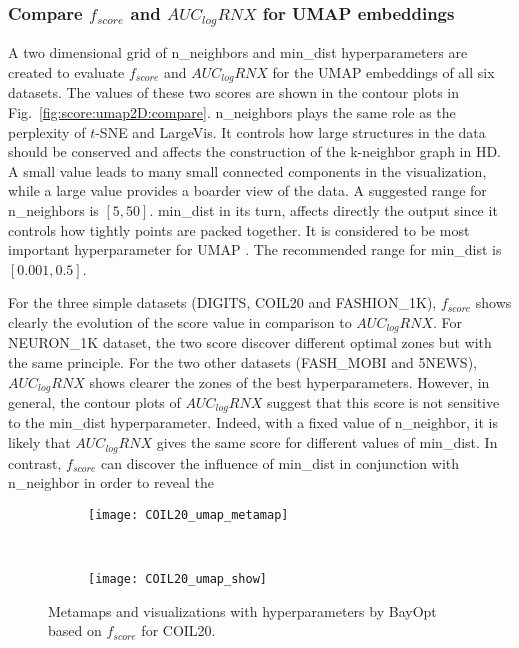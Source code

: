 \subsubsection{Compare $f_{score}$ and $AUC_{log}RNX$ for UMAP embeddings}\label{sec:compare:umap}

A two dimensional grid of {n\_neighbors} and {min\_dist} hyperparameters are created to evaluate $f_{score}$ and $AUC_{log}RNX$ for the UMAP embeddings of all six datasets.
The values of these two scores are shown in the contour plots in Fig.~\ref{fig:score:umap2D:compare}.
{n\_neighbors} plays the same role as the perplexity of $t$-SNE and LargeVis.
It controls how large structures in the data should be conserved and affects the construction of the k-neighbor graph in HD.
A small value leads to many small connected components in the visualization, while a large value provides a boarder view of the data.
A suggested range for {n\_neighbors} is $[5, 50]$.
{min\_dist} in its turn, affects directly the output since it controls how tightly points are packed together. It is considered to be most important hyperparameter for UMAP \cite{mcinnes2018umap}.
The recommended range for {min\_dist} is $[0.001, 0.5]$.

For the three simple datasets (DIGITS, COIL20 and {FASHION\_1K}), $f_{score}$ shows clearly the evolution of the score value in comparison to $AUC_{log}RNX$.
For {NEURON\_1K} dataset, the two score discover different optimal zones but with the same principle.
For the two other datasets ({FASH\_MOBI} and 5NEWS), $AUC_{log}RNX$ shows clearer the zones of the best hyperparameters.
However, in general, the contour plots of $AUC_{log}RNX$ suggest that this score is not sensitive to the {min\_dist} hyperparameter.
Indeed, with a fixed value of {n\_neighbor}, it is likely that $AUC_{log}RNX$ gives the same score for different values of {min\_dist}.
In contrast, $f_{score}$ can discover the influence of {min\_dist} in conjunction with {n\_neighbor} in order to reveal the 

\begin{figure*}[ht!]
    \centering
    \begin{subfigure}[b]{.8\linewidth}
        \centering
        \texttt{[image: COIL20\_umap\_metamap]}
    \end{subfigure}
    ~
    \begin{subfigure}[b]{.8\linewidth}
        \texttt{[image: COIL20\_umap\_show]}
    \end{subfigure}
    \caption{Metamaps and visualizations with hyperparameters by BayOpt based on $f_{score}$ for COIL20.}
    \label{fig:umap:meta:COIL20}
\end{figure*}


